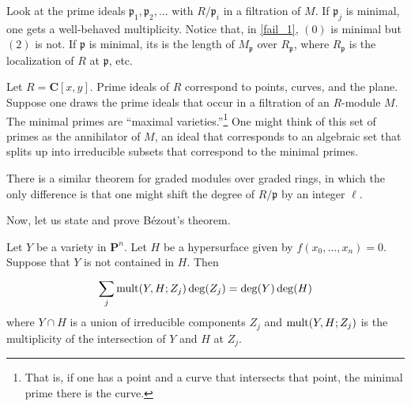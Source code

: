 \documentclass [11 pt, oneside, margin = 1 in] {article}
\begin{document}
Look at the prime ideals $\mathfrak{p}_1,\mathfrak{p}_2,\hdots$ with $R/\mathfrak{p}_i$ in a filtration of $M$. If $\mathfrak{p}_j$ is minimal, one gets a well-behaved multiplicity. Notice that, in \cref{fail_1}, $(0)$ is minimal but $(2)$ is not. If $\mathfrak{p}$ is minimal, its  is the length of $M_\mathfrak{p}$ over $R_\mathfrak{p}$, where $R_\mathfrak{p}$ is the localization of $R$ at $\mathfrak{p}$, etc.

Let $R=\mathbf{C}[x,y]$. Prime ideals of $R$ correspond to points, curves, and the plane. Suppose one draws the prime ideals that occur in a filtration of an $R$-module $M$. The minimal primes are ``maximal varieties.''\footnote{That is, if one has a point and a curve that intersects that point, the minimal prime there is the curve.} One might think of this set of primes as the annihilator of $M$, an ideal that corresponds to an algebraic set that splits up into irreducible subsets that correspond to the minimal primes.

There is a similar theorem for graded modules over graded rings, in which the only difference is that one might shift the degree of $R/\mathfrak{p}$ by an integer $\ell$. 

Now, let us state and prove B\'ezout's theorem.

\begin{theorem}[B\'ezout]\label{b_3}\text{}
Let $Y$ be a variety in $\mathbf{P}^n$. Let $H$ be a hypersurface given by $f(x_0,\hdots, x_n)=0$. Suppose that $Y$ is not contained in $H$. Then 
\begin{align*}
	\sum_{j}^{} \operatorname{mult}(Y, H; Z_j) \deg (Z_j) = \deg  (Y)\deg (H)
\end{align*}
where $Y\cap H$ is a union of irreducible components $Z_j$ and $\operatorname{mult}(Y,H;Z_j)$ is the multiplicity of the intersection of $Y$ and $H$ at $Z_j$.
\end{theorem}
\end{document}
